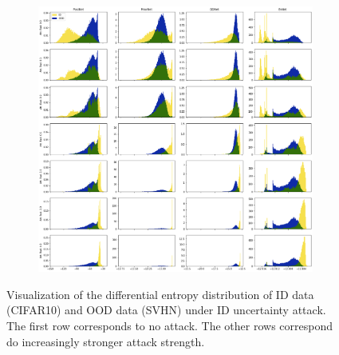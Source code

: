 \begin{figure}[ht!]
    \centering
        \begin{subfigure}[t]{1.0\textwidth}
        \centering
        \includegraphics[width=0.99 \textwidth]{sections/008_icml2021/eval/unc_dist_unc_id_cifar10_c.png}
    \end{subfigure}%
    \caption{Visualization of the differential entropy distribution of ID data (CIFAR10) and OOD data (SVHN) under ID uncertainty attack. The first row corresponds to no attack. The other rows correspond do increasingly stronger attack strength.}
    \label{fig:attaked_samples_idood_3}
	\vspace{-.5cm}
\end{figure}

